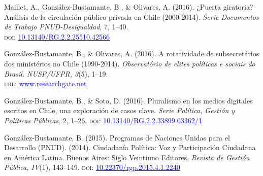 \begin{publications}

\begin{benumerate}{4}

\item{\small Maillet, A., González-Bustamante, B., \& Olivares, A. (2016). ¿Puerta giratoria? Análisis de la circulación público-privada en Chile (2000-2014). {\itshape Serie Documentos de Trabajo PNUD-Desigualdad}, 7, 1--40. \\ {\scshape doi}: \href{http://doi.org/10.13140/RG.2.2.25510.42566}{\textcolor{blue}{10.13140/RG.2.2.25510.42566}}}\vspace{1mm}

\item{\small González-Bustamante, B., \& Olivares, A. (2016). A rotatividade de subsecretários dos ministérios no Chile (1990-2014). {\itshape Observat\'orio de elites pol\'iticas e sociais do Brasil. NUSP/UFPR, 3}(5), 1--19. \\ {\scshape url}: \href{https://www.researchgate.net/publication/321993740_A_rotatividade_de_subsecretarios_dos_ministerios_no_Chile_1990-2014}{\textcolor{blue}{www.researchgate.net}}}\vspace{1mm}

\item{\small González-Bustamante, B., \& Soto, D. (2016). Pluralismo en los medios digitales escritos en Chile, una exploración de casos clave. {\itshape Serie Pol\'itica, Gesti\'on y Pol\'iticas P\'ublicas}, 2, 1--26. {\scshape doi}: \href{http://doi.org/10.13140/RG.2.2.33899.03362/1}{\textcolor{blue}{10.13140/RG.2.2.33899.03362/1}}}\vspace{1mm}

\item{\small González-Bustamante, B. (2015). Programas de Naciones Unidas para el Desarrollo (PNUD). (2014). Ciudadanía Política: Voz y Participación Ciudadana en América Latina. Buenos Aires: Siglo Veintiuno Editores. {\itshape Revista de Gestión Pública, IV}(1), 143--149. {\scshape doi}: \href{https://doi.org/10.22370/rgp.2015.4.1.2240}{\textcolor{blue}{10.22370/rgp.2015.4.1.2240}}}

\end{benumerate}

\end{publications}
